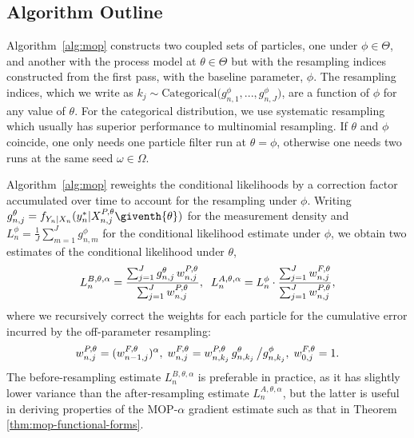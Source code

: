 \documentclass[9pt,twocolumn,pnasresearcharticle]{pnas-new}
\newcommand\arxiv[2]{#2} %
\begin{document}
\subsection{Algorithm Outline} 

Algorithm~\ref{alg:mop} constructs two coupled sets of particles, one under $\phi \in \Theta$, and another with the process model at $\theta \in \Theta$ but with the resampling indices constructed from the first pass, with the baseline parameter, $\phi$.
The resampling indices, which we write as $k_j \sim \text{Categorical}\big(g^{\phi}_{n,1},...,g^{\phi}_{n,J}\big)$, are a function of $\phi$ for any value of $\theta$.
For the categorical distribution, we use systematic resampling \cite{arulampalam02,king16} which usually has superior performance to multinomial resampling.
If $\theta$ and $\phi$ coincide, one only needs one particle filter run at $\theta=\phi$, otherwise one needs two runs at the same seed $\omega \in \Omega$.

Algorithm~\ref{alg:mop} reweights the conditional likelihoods by a correction factor accumulated over time to account for the resampling under $\phi$. 
Writing $g^{\theta}_{n,j}={f}_{{Y}_{n}|{X}_{n}}(y_{n}^{*}|{X}_{n,j}^{P,\theta}\giventh{\theta})$ for the measurement density and $L_n^{\phi} = \frac{1}{J}\sum_{m=1}^{J}g^{\phi}_{n,m}$ for the conditional likelihood estimate under $\phi$, we obtain two estimates of the conditional likelihood under $\theta$,
\arxiv{}{\vspace*{-1.5mm}}
\begin{equation}
     \label{eq:mop-conditional-likelihood}
     L_n^{B,\theta,\alpha} = \frac{\sum_{j=1}^Jg^\theta_{n,j}\, w^{P,\theta}_{n,j}}{\sum_{j=1}^J  w^{P,\theta}_{n,j}}, \arxiv{\hspace{15mm}}{\;\;}
     L_n^{A,\theta,\alpha} = L_n^\phi\cdot \frac{\sum_{j=1}^J w^{F,\theta}_{n,j}}{\sum_{j=1}^J  w^{P,\theta}_{n,j}},
     \arxiv{}{\vspace*{-1.5mm}}
\end{equation}
where we recursively correct the weights for each particle for the cumulative error incurred by the off-parameter resampling:
\arxiv{}{\vspace*{-1.5mm}}
\begin{equation}
    \label{eq:weighting-scheme}
    w_{n,j}^{P,\theta} = (w_{n-1,j}^{F,\theta})^\alpha, 
    \arxiv{\hspace{5mm}}{\;}
    w^{F,\theta}_{n,j} = w^{P,\theta}_{n,k_j} \, g^{\theta}_{n,k_j} \, \big/ g^{\phi}_{n,k_j}, 
    \arxiv{\hspace{5mm}}{\;}
    w^{F,\theta}_{0,j}= 1.
    \arxiv{}{\vspace*{-1.5mm}}
\end{equation}
The before-resampling estimate $L_n^{B,\theta,\alpha}$ is preferable in practice, as it has slightly lower variance than the after-resampling estimate $L_n^{A,\theta,\alpha}$, but the latter is useful in deriving properties of the MOP-$\alpha$ gradient estimate such as that in Theorem \ref{thm:mop-functional-forms}.
\end{document}
